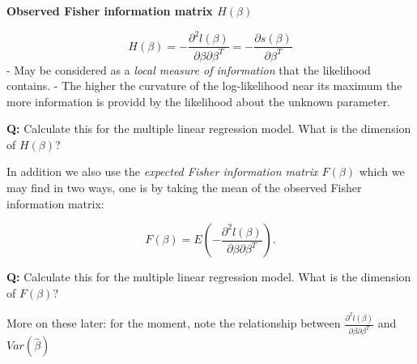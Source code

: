 \documentclass[
  ignorenonframetext,
]{beamer}
\begin{document}
\begin{frame}
\textbf{Observed Fisher information matrix \(H(\beta)\)}

\[
H(\beta) = -\frac{\partial^2l(\beta)}{\partial\beta\partial\beta^T} = -\frac{\partial s(\beta)}{\partial\beta^T}
\] - May be considered as a \emph{local measure of information} that the
likelihood contains. - The higher the curvature of the log-likelihood
near its maximum the more information is providd by the likelihood about
the unknown parameter.

\textbf{Q:} Calculate this for the multiple linear regression model.
What is the dimension of \(H(\beta)\)?
\end{frame}

\begin{frame}
In addition we also use the \emph{expected Fisher information matrix
\(F(\beta)\)} which we may find in two ways, one is by taking the mean
of the observed Fisher information matrix:

\[
F(\beta) = E\left( -\frac{\partial^2l(\beta)}{\partial\beta\partial\beta^T} \right).
\]

\textbf{Q:} Calculate this for the multiple linear regression model.
What is the dimension of \(F(\beta)\)?

More on these later: for the moment, note the relationship between
\(\frac{\partial^2l(\beta)}{\partial\beta\partial\beta^T}\) and
\(Var(\hat{\beta})\)
\end{frame}
\end{document}
